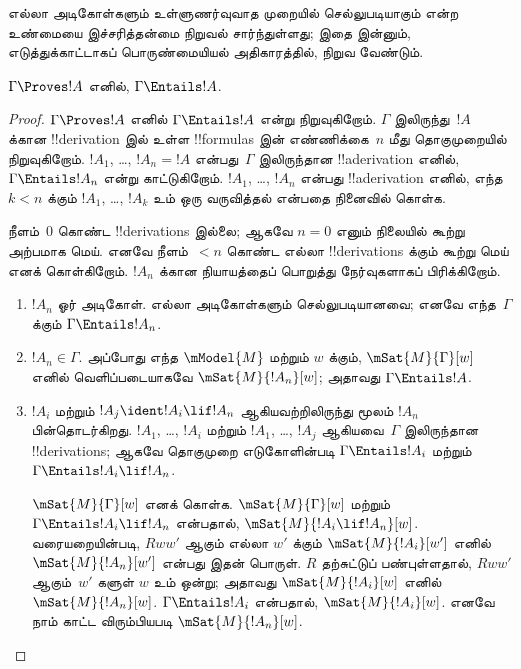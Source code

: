 \documentclass[../../../include/open-logic-section]{subfiles}
\begin{document}


\begin{editorial}
  எல்லா அடிகோள்களும் உள்ளுணர்வுவாத முறையில் செல்லுபடியாகும் என்ற உண்மையை
  இச்சரித்தன்மை நிறுவல் சார்ந்துள்ளது; இதை இன்னும், எடுத்துக்காட்டாகப்
  பொருண்மையியல் அதிகாரத்தில், நிறுவ வேண்டும்.
\end{editorial}

\begin{thm}[சரித்தன்மை]
  $\Gamma \Proves !A$ எனில், $ \Gamma \Entails !A$.
\end{thm}

\begin{proof}
  $\Gamma \Proves !A$ எனில் $\Gamma \Entails !A$ என்று நிறுவுகிறோம்.
  $\Gamma$ இலிருந்து~$!A$ க்கான !!{derivation} இல் உள்ள !!{formula}s இன்
  எண்ணிக்கை~$n$ மீது தொகுமுறையில் நிறுவுகிறோம். $!A_1$, \dots,
  $!A_n = !A$ என்பது~$\Gamma$ இலிருந்தான !!a{derivation} எனில்,
  $\Gamma \Entails !A_n$ என்று காட்டுகிறோம். $!A_1$, \dots, $!A_n$
  என்பது !!a{derivation} எனில், எந்த $k<n$ க்கும் $!A_1$, \dots,
  $!A_k$ உம் ஒரு வருவித்தல் என்பதை நினைவில் கொள்க.

  நீளம்~$0$ கொண்ட !!{derivation}s இல்லை; ஆகவே $n=0$ எனும் நிலையில்
  கூற்று அற்பமாக மெய். எனவே நீளம்~$<n$ கொண்ட எல்லா !!{derivation}s க்கும்
  கூற்று மெய் எனக் கொள்கிறோம். $!A_n$ க்கான நியாயத்தைப் பொறுத்து
  நேர்வுகளாகப் பிரிக்கிறோம்.

  \begin{enumerate}
  \item $!A_n$ ஓர் அடிகோள். எல்லா அடிகோள்களும் செல்லுபடியானவை; எனவே
    எந்த~$\Gamma$ க்கும் $\Gamma \Entails !A_n$.
  \item $!A_n \in \Gamma$. அப்போது எந்த $\mModel{M}$ மற்றும் $w$ க்கும்,
    $\mSat{M}{\Gamma}[w]$ எனில் வெளிப்படையாகவே
    $\mSat{M}{!A_n}[w]$; அதாவது $\Gamma \Entails !A$.
  \item $!A_i$ மற்றும் $!A_j \ident !A_i \lif !A_n$ ஆகியவற்றிலிருந்து
    \MP{} மூலம் $!A_n$ பின்தொடர்கிறது. $!A_1$, \dots, $!A_i$ மற்றும்
    $!A_1$, \dots, $!A_j$ ஆகியவை~$\Gamma$ இலிருந்தான !!{derivation}s;
    ஆகவே தொகுமுறை எடுகோளின்படி $\Gamma \Entails !A_i$ மற்றும்
    $\Gamma \Entails !A_i \lif !A_n$.

    $\mSat{M}{\Gamma}[w]$ எனக் கொள்க. $\mSat{M}{\Gamma}[w]$ மற்றும்
    $\Gamma \Entails !A_i \lif !A_n$ என்பதால்,
    $\mSat{M}{!A_i \lif !A_n}[w]$. வரையறையின்படி, $Rww'$ ஆகும் எல்லா
    $w'$ க்கும் $\mSat{M}{!A_i}[w']$ எனில் $\mSat{M}{!A_n}[w']$ என்பது
    இதன் பொருள். $R$ தற்சுட்டுப் பண்புள்ளதால், $Rww'$ ஆகும்~$w'$ களுள்
    $w$ உம் ஒன்று; அதாவது $\mSat{M}{!A_i}[w]$ எனில்
    $\mSat{M}{!A_n}[w]$. $\Gamma \Entails !A_i$ என்பதால்,
    $\mSat{M}{!A_i}[w]$. எனவே நாம் காட்ட விரும்பியபடி
    $\mSat{M}{!A_n}[w]$.
  \end{enumerate}
\end{proof}
\end{document}
